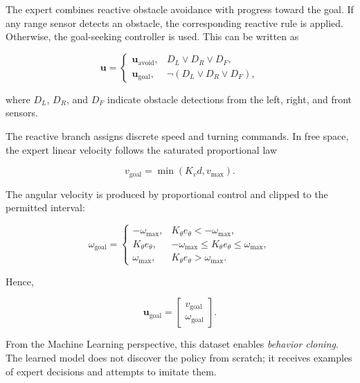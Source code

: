 \documentclass[10pt,twocolumn,a4paper]{article}
\begin{document}
The expert combines reactive obstacle avoidance with progress toward the
goal. If any range sensor detects an obstacle, the corresponding reactive
rule is applied. Otherwise, the goal-seeking controller is used. This can be
written as

\begin{equation}
\mathbf{u}=
\begin{cases}
    \mathbf{u}_{\mathrm{avoid}},
    & D_L\lor D_R\lor D_F,\\
    \mathbf{u}_{\mathrm{goal}},
    & \neg(D_L\lor D_R\lor D_F),
\end{cases}
\label{eq:expert_policy}
\end{equation}

where $D_L$, $D_R$, and $D_F$ indicate obstacle detections from the left,
right, and front sensors.

The reactive branch assigns discrete speed and turning commands. In free
space, the expert linear velocity follows the saturated proportional law

\begin{equation}
    v_{\mathrm{goal}}
    =
    \min(K_v d,v_{\max}).
    \label{eq:saturated_speed}
\end{equation}

The angular velocity is produced by proportional control and clipped to the
permitted interval:

\begin{equation}
\omega_{\mathrm{goal}}=
\begin{cases}
    -\omega_{\max}, & K_\theta e_\theta<-\omega_{\max},\\
    K_\theta e_\theta,
    & -\omega_{\max}\leq K_\theta e_\theta\leq\omega_{\max},\\
    \omega_{\max}, & K_\theta e_\theta>\omega_{\max}.
\end{cases}
\label{eq:clipped_omega}
\end{equation}

Hence,

\[
    \mathbf{u}_{\mathrm{goal}}=
    \begin{bmatrix}
        v_{\mathrm{goal}}\\
        \omega_{\mathrm{goal}}
    \end{bmatrix}.
\]

From the Machine Learning perspective, this dataset enables
\emph{behavior cloning}. The learned model does not discover the policy from
scratch; it receives examples of expert decisions and attempts to imitate
them.
\end{document}
